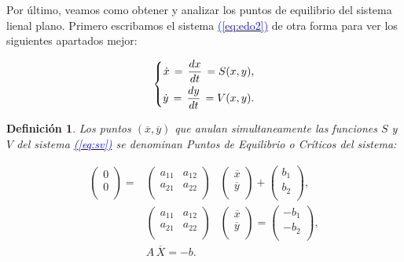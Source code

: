 \documentclass[12pt,a4paper]{report} %
\newtheorem{definicion}{Definición}[chapter]
\newcommand{\eref}[1]{\hyperref[#1]{\textcolor{blue}{(\ref*{#1})}}}
\begin{document}
	
	\vspace{0.5cm}Por último, veamos como obtener y analizar los puntos de equilibrio del sistema lienal plano. Primero escribamos el sistema \eref{eq:edo2} de otra forma para ver los siguientes apartados mejor:
	
	\begin{equation}
		\label{eq:sv}
		\scalebox{1}{$\displaystyle
			\left\{
			\begin{aligned}
				\dot{x}\,=\,\frac{dx}{dt}\,=S(x,y), \\
				\dot{y}\,=\,\frac{dy}{dt}\,=V(x,y).
			\end{aligned}
			\right.
			$}
	\end{equation}\smallskip
	
	\begin{definicion}
		Los puntos $(\overline{x},\overline{y})$ que anulan simultaneamente las funciones $S$ y $V$ del sistema \eref{eq:sv} se denominan Puntos de Equilibrio o Críticos del sistema:
	\end{definicion}

	\begin{eqnarray}
		\label{eq:crit}
			\begin{pmatrix}
				0\\
				0\\
			\end{pmatrix} =
			&\begin{pmatrix}
				a_{11} & a_{12}\\
				a_{21} & a_{22}\\
			\end{pmatrix}&
			\begin{pmatrix}
				\overline{x}\\
				\overline{y}\\
			\end{pmatrix} + 
			\begin{pmatrix}
				b_1\\
				b_2\\
			\end{pmatrix},\nonumber \\[4mm]
			&\begin{pmatrix}
			a_{11} & a_{12}\\
			a_{21} & a_{22}\\
			\end{pmatrix}&
			\begin{pmatrix}
			\overline{x}\\
			\overline{y}\\
			\end{pmatrix} = 
			\begin{pmatrix}
			-b_1\\
			-b_2\\
			\end{pmatrix}, \nonumber \\[4mm]
			&A\,\overline{X}=-b.
	\end{eqnarray}\smallskip
	
\end{document}

